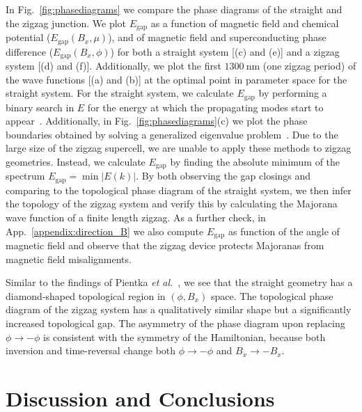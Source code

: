 In Fig.~\ref{fig:phasediagrams} we compare the phase diagrams of the straight and the zigzag junction.
We plot $E_\textrm{gap}$ as a function of magnetic field and chemical potential ($E_\textrm{gap}(B_x, \mu)$), and of magnetic field and superconducting phase difference ($E_\textrm{gap}(B_x, \phi)$) for both a straight system [(c) and (e)] and a zigzag system [(d) and (f)].
Additionally, we plot the first $\SI{1300}{\nm}$ (one zigzag period) of the wave functions [(a) and (b)] at the optimal point in parameter space for the straight system.
For the straight system, we calculate $E_\textrm{gap}$ by performing a binary search in $E$ for the energy at which the propagating modes start to appear~\cite{Nijholt2016}.
Additionally, in Fig.~\ref{fig:phasediagrams}(c) we plot the phase boundaries obtained by solving a generalized eigenvalue problem~\cite{Nijholt2016}.
Due to the large size of the zigzag supercell, we are unable to apply these methods to zigzag geometries.
Instead, we calculate $E_\textrm{gap}$ by finding the absolute minimum of the spectrum $E_\textrm{gap}=\min{\left|E(k)\right|}$.
By both observing the gap closings and comparing to the topological phase diagram of the straight system, we then infer the topology of the zigzag system and verify this by calculating the Majorana wave function of a finite length zigzag.
As a further check, in App.~\ref{appendix:direction_B} we also compute $E_\textrm{gap}$ as function of the angle of magnetic field and observe that the zigzag device protects Majoranas from magnetic field misalignments.

Similar to the findings of Pientka \textit{et al.}~\cite{Pientka2017}, we see that the straight geometry has a diamond-shaped topological region in $(\phi, B_x)$ space.
The topological phase diagram of the zigzag system has a qualitatively similar shape but a significantly increased topological gap.
The asymmetry of the phase diagram upon replacing $\phi \rightarrow -\phi$ is consistent with the symmetry of the Hamiltonian, because both inversion and time-reversal change both $\phi \rightarrow -\phi$ and $B_x \rightarrow -B_x$.


\section{Discussion and Conclusions}

